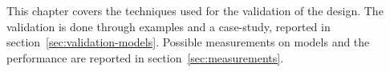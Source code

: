 This chapter covers the techniques used for the validation of the design. The validation is done through examples and a case-study, reported in section~\ref{sec:validation-models}. Possible measurements on models and the performance are reported in section~\ref{sec:measurements}.

